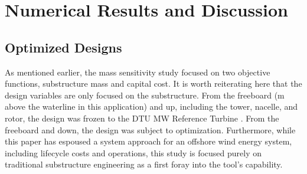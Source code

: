 \chapter{Numerical Results and Discussion}
\label{sec:results}

\section{Optimized Designs}
As mentioned earlier, the mass sensitivity study focused on two
objective functions, substructure mass and capital cost.  It is worth
reiterating here that the design variables are only focused on the
substructure.  From the freeboard (\unit[10]{m} above the waterline in
this application) and up, including the tower, nacelle, and rotor, the
design was frozen to the DTU \unit[10]{MW} Reference Turbine
\citep{dtu10mw}.  From the freeboard and down, the design was subject to
optimization.  Furthermore, while this paper has espoused a system
approach for an offshore wind energy system, including lifecycle costs
and operations, this study is focused purely on traditional substructure
engineering as a first foray into the tool's capability.

